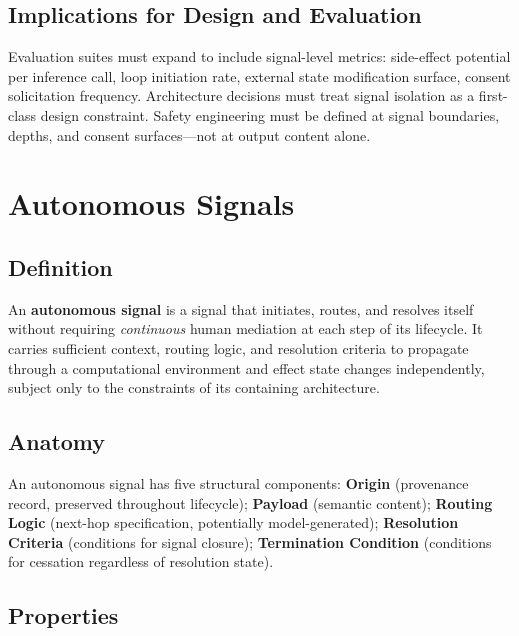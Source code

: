 \documentclass[11pt,a4paper]{article}
\begin{document}
\subsection{Implications for Design and Evaluation}

Evaluation suites must expand to include signal-level metrics: side-effect potential per
inference call, loop initiation rate, external state modification surface, consent solicitation
frequency. Architecture decisions must treat signal isolation as a first-class design constraint.
Safety engineering must be defined at signal boundaries, depths, and consent surfaces---not at
output content alone.

\section{Autonomous Signals}
\label{sec:autonomoussignals}

\subsection{Definition}

\begin{definitionbox}[title=Definition 3.1 --- Autonomous Signal]
An \textbf{autonomous signal} is a signal that initiates, routes, and resolves itself without
requiring \emph{continuous} human mediation at each step of its lifecycle. It carries sufficient
context, routing logic, and resolution criteria to propagate through a computational environment
and effect state changes independently, subject only to the constraints of its containing
architecture.
\end{definitionbox}

\subsection{Anatomy}

An autonomous signal has five structural components:
\textbf{Origin} (provenance record, preserved throughout lifecycle);
\textbf{Payload} (semantic content);
\textbf{Routing Logic} (next-hop specification, potentially model-generated);
\textbf{Resolution Criteria} (conditions for signal closure);
\textbf{Termination Condition} (conditions for cessation regardless of resolution state).

\subsection{Properties}
\end{document}
